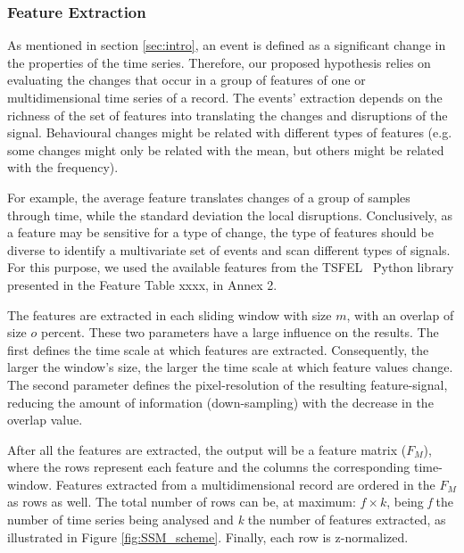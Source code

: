 \subsubsection{Feature Extraction}

As mentioned in section \ref{sec:intro}, an event is defined as a significant change in the properties of the time series. Therefore, our proposed hypothesis relies on evaluating the changes that occur in a group of features of one or multidimensional time series of a record. The events' extraction depends on the richness of the set of features into translating the changes and disruptions of the signal. Behavioural changes might be related with different types of features (e.g. some changes might only be related with the mean, but others might be related with the frequency).
\par 
For example, the average feature translates changes of a group of samples through time, while the standard deviation the local disruptions. Conclusively, as a feature may be sensitive for a type of change, the type of features should be diverse to identify a multivariate set of events and scan different types of signals. For this purpose, we used the available features from the TSFEL~\cite{barandas_tsfel_2020} Python library presented in the Feature Table xxxx, in Annex 2.
\par
The features are extracted in each sliding window with size $m$, with an overlap of size $o$ percent. These two parameters have a large influence on the results. The first defines the time scale at which features are extracted. Consequently, the larger the window's size, the larger the time scale at which feature values change. The second parameter defines the pixel-resolution of the resulting feature-signal, reducing the amount of information (down-sampling) with the decrease in the overlap value.
\par
After all the features are extracted, the output will be a feature matrix ($F_{M}$), where the rows represent each feature and the columns the corresponding time-window. Features extracted from a multidimensional record are ordered in the $F_M$ as rows as well. The total number of rows can be, at maximum: $f \times k$, being \textit{f} the number of time series being analysed and \textit{k} the number of features extracted, as illustrated in Figure \ref{fig:SSM_scheme}. Finally, each row is z-normalized.
\par





